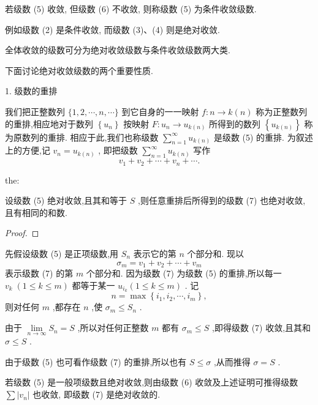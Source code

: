 若级数 (5) 收敛, 但级数 (6) 不收敛, 则称级数 (5) 为条件收敛级数.

例如级数 (2) 是条件收敛, 而级数 (3)、(4) 则是绝对收敛.

全体收敛的级数可分为绝对收敛级数与条件收敛级数两大类.

下面讨论绝对收敛级数的两个重要性质.

1. 级数的重排

我们把正整数列 \(\{ 1,2,\cdots ,n,\cdots \}\) 到它自身的一一映射 \(f : n \rightarrow  k\left( n\right)\) 称为正整数列的重排,相应地对于数列 \(\left\{  {u}_{n}\right\}\) 按映射 \(F : {u}_{n} \rightarrow  {u}_{k\left( n\right) }\) 所得到的数列 \(\left\{  {u}_{k\left( n\right) }\right\}\) 称为原数列的重排. 相应于此,我们也称级数 \(\mathop{\sum }\limits_{{n = 1}}^{\infty }{u}_{k\left( n\right) }\) 是级数 (5) 的重排. 为叙述上的方便,记 \({v}_{n} = {u}_{k\left( n\right) }\) , 即把级数 \(\mathop{\sum }\limits_{{n = 1}}^{\infty }{u}_{k\left( n\right) }\) 写作
\[
{v}_{1} + {v}_{2} + \cdots  + {v}_{n} + \cdots . \tag{7}
\]
\begin{theorem}{}{the:}

\end{theorem}
 设级数 (5) 绝对收敛,且其和等于 \(S\) ,则任意重排后所得到的级数 (7) 也绝对收敛, 且有相同的和数.

\begin{proof}

\end{proof}
先假设级数 (5) 是正项级数,用 \({S}_{n}\) 表示它的第 \(n\) 个部分和. 现以
\[
{\sigma }_{m} = {v}_{1} + {v}_{2} + \cdots  + {v}_{m}
\]
表示级数 (7) 的第 \(m\) 个部分和. 因为级数 (7) 为级数 (5) 的重排,所以每一 \({v}_{k}\;\left( {1 \leq  k \leq  m}\right)\) 都等于某一 \({u}_{{i}_{k}}\left( {1 \leq  k \leq  m}\right)\) . 记
\[
n = \max \left\{  {{i}_{1},{i}_{2},\cdots ,{i}_{m}}\right\}  ,
\]
则对任何 \(m\) ,都存在 \(n\) ,使 \({\sigma }_{m} \leq  {S}_{n}\) .

由于 \(\mathop{\lim }\limits_{{n \rightarrow  \infty }}{S}_{n} = S\) ,所以对任何正整数 \(m\) 都有 \({\sigma }_{m} \leq  S\) ,即得级数 (7) 收敛,且其和 \(\sigma  \leq  S\) .

由于级数 (5) 也可看作级数 (7) 的重排,所以也有 \(S \leq  \sigma\) ,从而推得 \(\sigma  = S\) .

若级数 (5) 是一般项级数且绝对收敛,则由级数 (6) 收敛及上述证明可推得级数 \(\sum \left| {v}_{n}\right|\) 也收敛, 即级数 (7) 是绝对收敛的.

